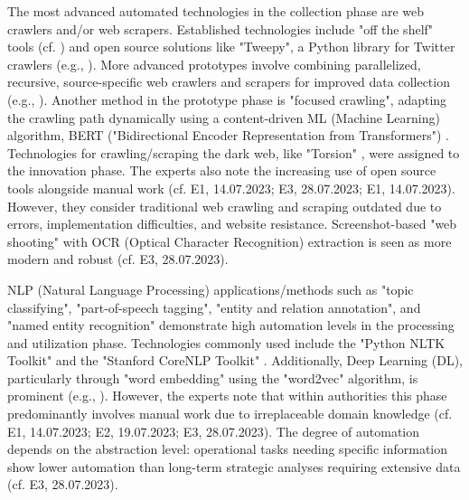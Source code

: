 \documentclass[10pt]{article}
\begin{document}
The most advanced automated technologies in the collection phase are web crawlers and/or web scrapers.
Established technologies include "off the shelf" tools (cf. \cite{Middleton.2020}) and open source
solutions like "Tweepy", a Python library for Twitter crawlers (e.g., \cite{Adewopo.2020}).
More advanced prototypes involve combining parallelized, recursive, source-specific web crawlers and scrapers for improved
data collection (e.g., \cite{Jenkins.2021}). Another method in the prototype phase is
"focused crawling", adapting the crawling path dynamically using a content-driven ML (Machine Learning) algorithm, BERT ("Bidirectional Encoder Representation from Transformers")
\cite{Kuehn.2023}. Technologies for crawling/scraping the dark web, like "Torsion" \cite{Sonawane.2022},
were assigned to the innovation phase. The experts also note the increasing use of open source tools alongside manual work
(cf. E1, 14.07.2023; E3, 28.07.2023; E1, 14.07.2023). However, they consider traditional web crawling and scraping
outdated due to errors, implementation difficulties, and website resistance. Screenshot-based "web shooting" with
OCR (Optical Character Recognition) extraction is seen as more modern and robust (cf. E3, 28.07.2023).

NLP (Natural Language Processing) applications/methods such as "topic classifying", "part-of-speech tagging", "entity and relation annotation", and "named entity recognition"
demonstrate high automation levels in the processing and utilization phase. Technologies commonly used include
the "Python NLTK Toolkit" \cite{Hubbard.2022} and the "Stanford CoreNLP Toolkit" \cite{Middleton.2020}.
Additionally, Deep Learning (DL), particularly through "word embedding" using the "word2vec" algorithm, is prominent
(e.g., \cite{Bai.2020}). However, the experts note that within authorities this phase predominantly involves manual work due to irreplaceable domain knowledge
(cf. E1, 14.07.2023; E2, 19.07.2023; E3, 28.07.2023). The degree of automation depends on the abstraction level:
operational tasks needing specific information show lower automation than long-term strategic analyses requiring
extensive data (cf. E3, 28.07.2023).
\end{document}
